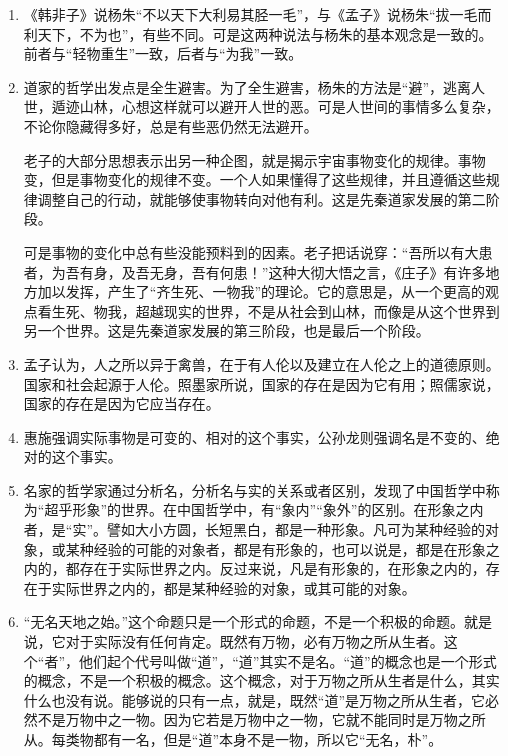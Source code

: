 \documentclass[UTF8]{ctexart}
\begin{document}
\begin{enumerate}
			\item 《韩非子》说杨朱“不以天下大利易其胫一毛”，与《孟子》说杨朱“拔一毛而利天下，不为也”，有些不同。可是这两种说法与杨朱的基本观念是一致的。前者与“轻物重生”一致，后者与“为我”一致。
			
			\item 道家的哲学出发点是全生避害。为了全生避害，杨朱的方法是“避”，逃离人世，遁迹山林，心想这样就可以避开人世的恶。可是人世间的事情多么复杂，不论你隐藏得多好，总是有些恶仍然无法避开。
			
			老子的大部分思想表示出另一种企图，就是揭示宇宙事物变化的规律。事物变，但是事物变化的规律不变。一个人如果懂得了这些规律，并且遵循这些规律调整自己的行动，就能够使事物转向对他有利。这是先秦道家发展的第二阶段。
			
			可是事物的变化中总有些没能预料到的因素。老子把话说穿：“吾所以有大患者，为吾有身，及吾无身，吾有何患！”这种大彻大悟之言，《庄子》有许多地方加以发挥，产生了“齐生死、一物我”的理论。它的意思是，从一个更高的观点看生死、物我，超越现实的世界，不是从社会到山林，而像是从这个世界到另一个世界。这是先秦道家发展的第三阶段，也是最后一个阶段。
			
			\item 孟子认为，人之所以异于禽兽，在于有人伦以及建立在人伦之上的道德原则。国家和社会起源于人伦。照墨家所说，国家的存在是因为它有用；照儒家说，国家的存在是因为它应当存在。
			
			\item 惠施强调实际事物是可变的、相对的这个事实，公孙龙则强调名是不变的、绝对的这个事实。
			
			\item 名家的哲学家通过分析名，分析名与实的关系或者区别，发现了中国哲学中称为“超乎形象”的世界。在中国哲学中，有“象内”“象外”的区别。在形象之内者，是“实”。譬如大小方圆，长短黑白，都是一种形象。凡可为某种经验的对象，或某种经验的可能的对象者，都是有形象的，也可以说是，都是在形象之内的，都存在于实际世界之内。反过来说，凡是有形象的，在形象之内的，存在于实际世界之内的，都是某种经验的对象，或其可能的对象。
			
			\item “无名天地之始。”这个命题只是一个形式的命题，不是一个积极的命题。就是说，它对于实际没有任何肯定。既然有万物，必有万物之所从生者。这个“者”，他们起个代号叫做“道”，“道”其实不是名。“道”的概念也是一个形式的概念，不是一个积极的概念。这个概念，对于万物之所从生者是什么，其实什么也没有说。能够说的只有一点，就是，既然“道”是万物之所从生者，它必然不是万物中之一物。因为它若是万物中之一物，它就不能同时是万物之所从。每类物都有一名，但是“道”本身不是一物，所以它“无名，朴”。
			

\end{enumerate}
\end{document}
